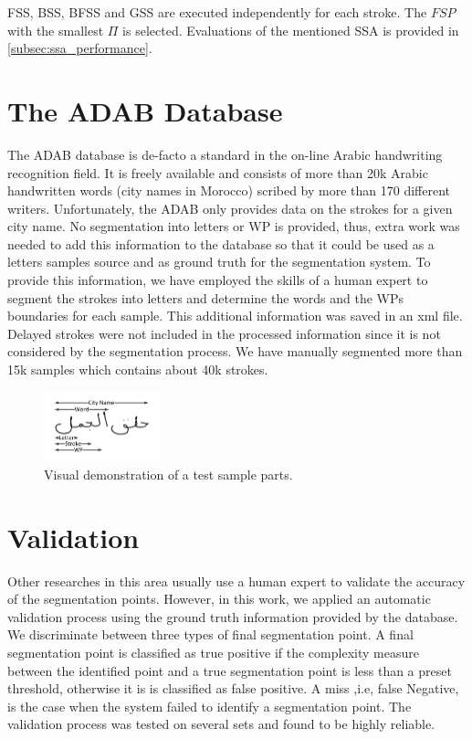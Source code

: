 \documentclass[10pt, conference, compsocconf]{IEEEtran}
\begin{document}
FSS, BSS, BFSS and GSS are executed independently for each stroke. The $FSP$ with the smallest $\Pi$ is selected. Evaluations of the mentioned SSA is provided in \ref{subsec:ssa_performance}. 



\section{The ADAB Database}
\label{sec:database}
The ADAB database is de-facto a standard in the on-line Arabic handwriting recognition field. It is freely available and consists of more than 20k Arabic handwritten words (city names in Morocco) scribed by more than 170 different writers. 
Unfortunately, the ADAB only provides data on the strokes for a given city name. 
No segmentation into letters or WP is provided, thus, extra work was needed to add this information to the database so that it could be used as a letters samples source and as ground truth for the segmentation system.
To provide this information, we have employed the skills of a human expert to segment the strokes into letters and determine the words and the WPs boundaries for each sample. 
This additional information was saved in an xml file. Delayed strokes were not included in the processed information since it is not considered by the segmentation process.
We have manually segmented more than 15k samples which contains about 40k strokes. 

\begin{figure}
\centering
\includegraphics[width=0.3\textwidth]{./figures/sample_parts}
\caption{Visual demonstration of a test sample parts.}
\label{fig:sample_parts}
\end{figure}

\section{Validation}
\label{sec:validation}
Other researches in this area usually use a human expert to validate the accuracy of the segmentation points. However, in this work, we applied an automatic validation process using the ground truth information provided by the database. We discriminate between three types of final segmentation point. A final segmentation point is classified as true positive if the complexity measure between the identified point and a true segmentation point is less than a preset threshold, otherwise it is is classified as false positive. A miss ,i.e, false Negative, is the case when the system failed to identify a segmentation point. The validation process was tested on several sets and found to be highly reliable.
\end{document}
